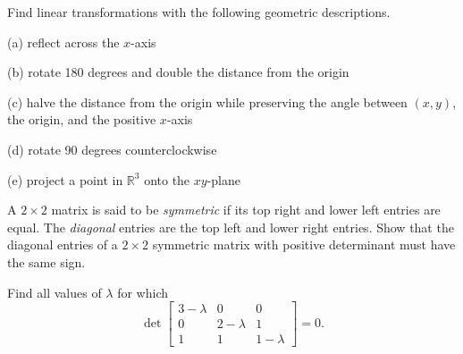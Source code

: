 \documentclass[svgnames]{watsonbook}
\begin{document}
\newpage 


\begin{aexercise}
Find linear transformations with the following geometric
descriptions. 

(a) reflect across the $x$-axis

(b) rotate 180 degrees and double the distance from the origin

(c) halve the distance from the origin while preserving the angle
between $(x,y)$, the origin, and the positive $x$-axis

(d) rotate 90 degrees counterclockwise

(e) project a point in $\mathbb{R}^3$ onto the $xy$-plane
\end{aexercise}


\begin{aexercise}
  A $2\times 2$ matrix is said to be \textit{symmetric} if its top
  right and lower left entries are equal. The \textit{diagonal}
  entries are the top left and lower right entries. Show that the
  diagonal entries of a $2\times 2$
  symmetric matrix with positive determinant must have the same sign. 
\end{aexercise}

\begin{aexercise}
  Find all values of $\lambda$ for which 
\[
\det \left[
\begin{array}{ccc}
3 - \lambda & 0 & 0 \\
0 & 2-\lambda & 1 \\
1 & 1 & 1 - \lambda
\end{array}
\right]
= 0. 
\]
\end{aexercise}

\newpage 

\end{document}
